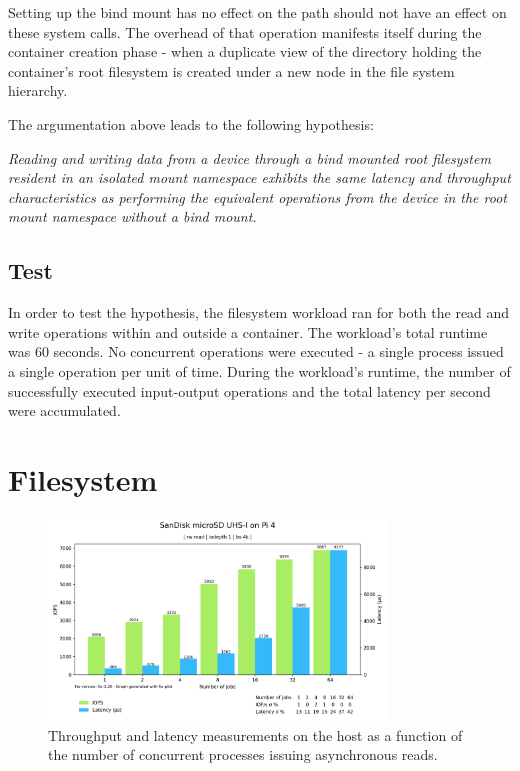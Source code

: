 Setting up the bind mount has no effect on 
the path should not have an effect on these system calls. The overhead of that operation manifests itself
during the container creation phase - when a duplicate view of the directory holding 
the container's root filesystem is created under a new node in the file system hierarchy.

The argumentation above leads to the following hypothesis:

\textit{Reading and writing data from a device through a bind mounted root filesystem resident in an isolated mount namespace exhibits
the same latency and throughput characteristics as performing the equivalent operations from the device in the root mount namespace without a bind mount.}

\subsection{Test}
In order to test the hypothesis, the filesystem workload ran for both the read and write 
operations within and outside a container. The workload's total runtime was 60 seconds.
No concurrent operations were executed - a single process issued a single operation per unit of time. 
During the workload's runtime, the number of successfully executed input-output operations and the total latency per second 
were accumulated. 

\section{Filesystem}
\label{ch:experiment/filesystem}

\begin{figure}[H]
    \centering
    \includegraphics[width=0.8\textwidth]{images/results/sandisk-host-libaio-read-numjobs-iops-latency.png}
    \caption{Throughput and latency measurements on the host as a function of the number of concurrent processes issuing asynchronous reads.}
    \label{images:fundamentals/net-ns-veth-arch.jpg}
\end{figure}

